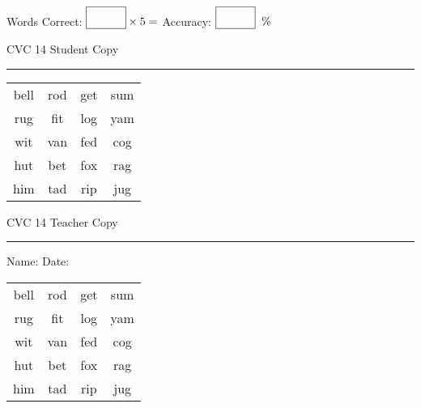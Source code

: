 \documentclass{memoir}
\begin{document}
\normalsize

Words Correct: $\fbox{\phantom{\huge 100}} \times 5 = $ Accuracy: $\fbox{\phantom{\huge 100}}\;\; \%$ 

\vfill

\newpage


\footnotesize \noindent
CVC 14 \hfill Student Copy
\smallskip
\hrule

\huge

\setlength{\tabcolsep}{14pt}
\def\arraystretch{2}

{\selectfont


\begin{vplace}[0.5]
\begin{center}
\begin{tabular}{cccc}
bell & rod & get & sum \\
rug & fit & log & yam \\
wit & van & fed & cog \\
hut & bet & fox & rag \\
him & tad & rip & jug \\
\end{tabular}
\end{center}
\end{vplace}

}

\newpage

\footnotesize \noindent
CVC 14 \hfill Teacher Copy
\smallskip
\hrule

\normalsize

\vfill

\noindent
Name: \underline{\hspace{1.75in}} \hfill Date: \underline{\hspace{1in}}

\huge

{\selectfont


\begin{vplace}[0.5]
\begin{center}
\begin{tabular}{cccc}
bell & rod & get & sum \\
rug & fit & log & yam \\
wit & van & fed & cog \\
hut & bet & fox & rag \\
him & tad & rip & jug \\
\end{tabular}
\end{center}
\end{vplace}



}
\end{document}
